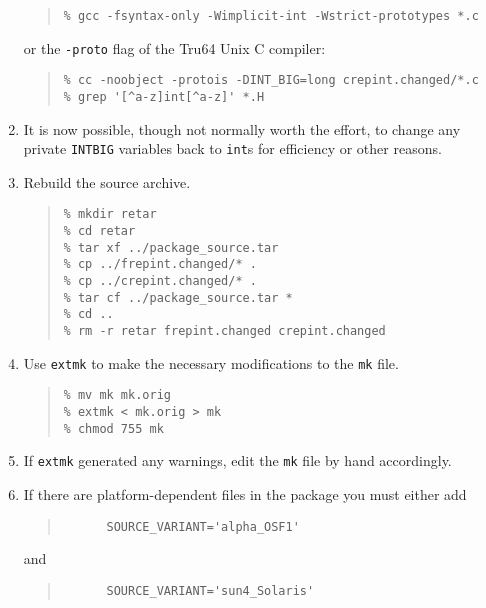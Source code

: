 \documentclass[twoside,11pt]{article}
\newcommand{\htmlref}[2]{#1}
\newcommand{\html}[1]{}
\renewcommand{\_}{\texttt{\symbol{95}}}
\newcommand{\xroutine}[1]{\htmlref{{\tt #1}}{#1}}
\newcommand{\file}[1]{{\tt #1}}
\newcommand{\routine}[1]{{\tt #1}}
\newcommand{\cc}[1]{{\tt #1}}
\newenvironment{squote}{\begin{quote}\begin{small}}{\end{small}\end{quote}}
\begin{document}
\begin{enumerate}
\begin{squote}
\begin{verbatim}
% gcc -fsyntax-only -Wimplicit-int -Wstrict-prototypes *.c
\end{verbatim}
\end{squote}
or the {\tt -proto} flag of the Tru64 Unix C compiler:
\begin{squote}
\begin{verbatim}
% cc -noobject -protois -DINT_BIG=long crepint.changed/*.c
% grep '[^a-z]int[^a-z]' *.H
\end{verbatim}
\end{squote}
%
\item
It is now possible, though not normally worth the effort,
to change any private \cc{INT\_BIG} variables back to \cc{int}s
for efficiency or other reasons.
\html{\begin{squote}\end{squote}}
%
\item
Rebuild the source archive.
\begin{squote}
\begin{verbatim}
% mkdir retar
% cd retar
% tar xf ../package_source.tar
% cp ../frepint.changed/* .
% cp ../crepint.changed/* .
% tar cf ../package_source.tar *
% cd ..
% rm -r retar frepint.changed crepint.changed
\end{verbatim}
\end{squote}
%
\item
Use \xroutine{extmk} to make the necessary modifications to the \file{mk} file.
\begin{squote}
\begin{verbatim}
% mv mk mk.orig
% extmk < mk.orig > mk
% chmod 755 mk
\end{verbatim}
\end{squote}
%
\item
If \routine{extmk} generated any warnings, edit the \file{mk} file by
hand accordingly.
\html{\begin{squote}\end{squote}}
%
\item
If there are platform-dependent files in the package you must either add
\begin{squote}
\begin{verbatim}
      SOURCE_VARIANT='alpha_OSF1'
\end{verbatim}
\end{squote}
and
\begin{squote}
\begin{verbatim}
      SOURCE_VARIANT='sun4_Solaris'

\end{verbatim}
\end{squote}
\end{enumerate}
\end{document}
